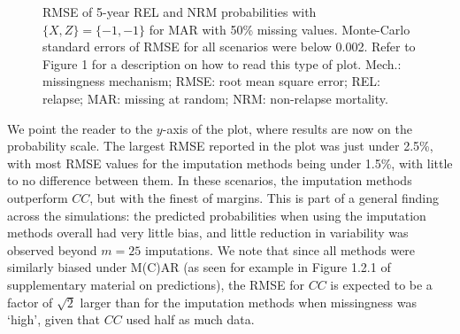 \documentclass[
  letterpaper,
  DIV=11,
  numbers=noendperiod]{scrreprt}
\begin{document}
\begin{figure}


\caption{\label{fig-five-year-MAR}RMSE of 5-year REL and NRM
probabilities with \(\{X, Z\} = \{-1, -1\}\) for MAR with 50\% missing
values. Monte-Carlo standard errors of RMSE for all scenarios were below
0.002. Refer to Figure 1 for a description on how to read this type of
plot. Mech.: missingness mechanism; RMSE: root mean square error; REL:
relapse; MAR: missing at random; NRM: non-relapse mortality.}

\end{figure}%

We point the reader to the \(y\)-axis of the plot, where results are now
on the probability scale. The largest RMSE reported in the plot was just
under 2.5\%, with most RMSE values for the imputation methods being
under 1.5\%, with little to no difference between them. In these
scenarios, the imputation methods outperform \(CC\), but with the finest
of margins. This is part of a general finding across the simulations:
the predicted probabilities when using the imputation methods overall
had very little bias, and little reduction in variability was observed
beyond \(m = 25\) imputations. We note that since all methods were
similarly biased under M(C)AR (as seen for example in Figure 1.2.1 of
supplementary material on predictions), the RMSE for \(CC\) is expected
to be a factor of \(\sqrt{2}\) larger than for the imputation methods
when missingness was `high', given that \(CC\) used half as much data.
\end{document}
